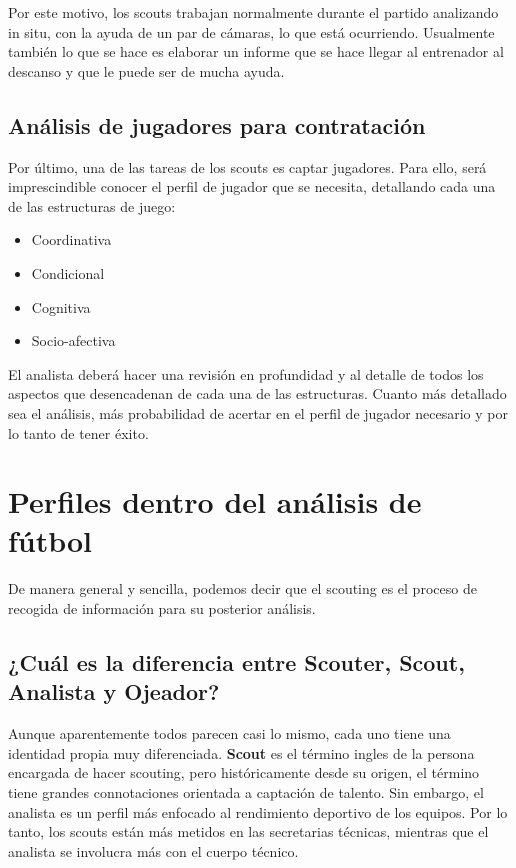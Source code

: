 Por este motivo, los scouts trabajan normalmente durante el partido analizando 
in situ, con la ayuda de un par de cámaras, lo que está 
ocurriendo. Usualmente también lo que se hace es elaborar un informe 
que se hace llegar al entrenador al descanso y que le puede ser 
de mucha ayuda.


\subsection{Análisis de jugadores para contratación}

Por último, una de las tareas de los scouts es captar jugadores. 
Para ello, será imprescindible conocer el perfil de jugador que 
se necesita, detallando cada una de las estructuras de juego:

\begin{itemize}
    \item Coordinativa
    \item Condicional
    \item Cognitiva
    \item Socio-afectiva
\end{itemize}

El analista deberá hacer una revisión en profundidad y al detalle de 
todos los aspectos que desencadenan de cada una de las estructuras. 
Cuanto más detallado sea el análisis, más probabilidad de acertar 
en el perfil de jugador necesario y por lo tanto de tener éxito.

\section{Perfiles dentro del análisis de fútbol}
De manera general y sencilla, podemos decir que el scouting es el proceso de 
recogida de información para su posterior análisis.

\subsection{¿Cuál es la diferencia entre Scouter, Scout, Analista y Ojeador?}
Aunque aparentemente todos parecen casi lo mismo, cada uno tiene una 
identidad propia muy diferenciada. \textbf{Scout} es el término ingles de la 
persona encargada de hacer scouting, pero históricamente desde su 
origen, el término tiene grandes connotaciones orientada a captación 
de talento. Sin embargo, el analista es un perfil más enfocado al 
rendimiento deportivo de los equipos. Por lo tanto, los scouts están 
más metidos en las secretarias técnicas, mientras que el analista 
se involucra más con el cuerpo técnico.

